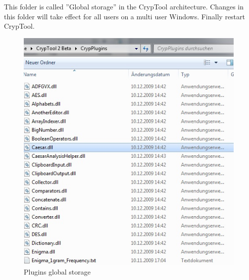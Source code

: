 \begin{itemize}
This folder is called ''Global storage'' in the CrypTool architecture. Changes in this folder will take effect for all users on a multi user Windows. Finally restart CrypTool.\clearpage
\begin{figure}[h]
	\centering
		\includegraphics{figures/global_storage.jpg}
	\caption{Plugins global storage}
	\label{fig:global_storage}
\end{figure}


\end{itemize}
